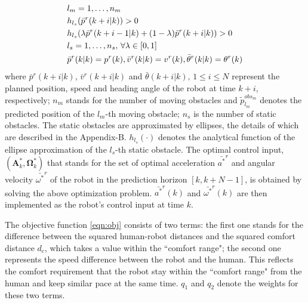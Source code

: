 \documentclass[journal]{IEEEtran}
\begin{document}
\begin{subequations}
\begin{align}
		& l_m=1,\dots,n_m\notag\\
		& h_{l_s}(\bar{p}^r(k+i|k))> 0\label{eqn:constr:safety_s_obs1}\\
		& h_{l_s}(\lambda \bar{p}^r(k+i-1|k)+(1-\lambda)\bar{p}^r(k+i|k))> 0\label{eqn:constr:safety_s_obs2}\\
		& l_s=1,\dots,n_s,\, \forall \lambda\in \left[ 0, 1\right] \notag\\
		& \bar{p}^r(k|k)=p^r(k),\bar{v}^r(k|k)=v^r(k),\bar{\theta}^r(k|k)=\theta^r(k)\label{eqn:constr:init}
		\end{align}
	\end{subequations} \normalsize
	where $\bar{p}^r(k+i|k)$, $\bar{v}^r(k+i|k)$ and $\bar{\theta}(k+i|k),\, 1\le i\le N$ represent the planned position, speed and heading angle of the robot at time $k+i$, respectively;
	$n_m$ stands for the number of moving obstacles and $\tilde{p}^{obs_m}_{l_m}$ denotes the predicted position of the $l_m$-th moving obstacle;
	$n_s$ is the number of static obstacles.
	The static obstacles are approximated by ellipses, the details of which are described in the Appendix-B.
	$h_{l_s}(\cdot)$ denotes the analytical function of the ellipse approximation of the $l_s$-th static obstacle.
	The optimal control input, $(\mathbf{A}^*_k,\mathbf{\Omega}^*_k)$ that stands for the set of optimal acceleration $\bar{a^*}^r$ and angular velocity $\bar{\omega^*}^r$ of the robot in the prediction horizon $[k,k+N-1]$, is obtained by solving the above optimization problem.
	$\bar{a^*}^r(k)$ and $\bar{\omega^*}^r(k)$ are then implemented as the robot's control input at time $k$.
	
	The objective function \cref{eqn:obj} consists of two terms: the first one stands for the difference between the squared human-robot distances and the squared comfort distance $d_c$, which takes a value within the ``comfort range"; the second one represents the speed difference between the robot and the human.
	This reflects the comfort requirement that the robot stay within the ``comfort range" from the human and keep similar pace at the same time.
	$q_1$ and $q_2$ denote the weights for these two terms.
	
\end{document}
